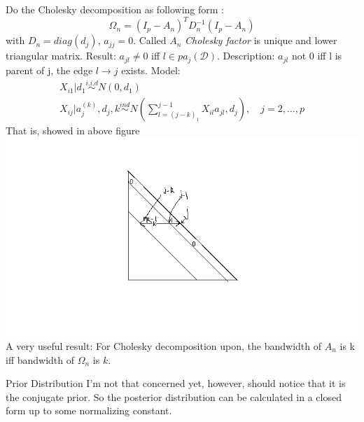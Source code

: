 \documentclass[]{article}
\begin{document}
Do the Cholesky decomposition as following form : \[
\Omega _ { n } = \left( I _ { p } - A _ { n } \right) ^ { T } D _ { n } ^ { - 1 } \left( I _ { p } - A _ { n } \right)
\] with \(D_n=diag(d_j)\), \(a_{jj}=0\). Called \(A_n\) \emph{Cholesky
factor} is unique and lower triangular matrix. Result: \(a_{jl}\neq0\)
iff \(l\in pa_j(\mathcal D)\). Description: \(a_{jl}\) not 0 iff l is
parent of j, the edge \(l\rightarrow j\) exists. Model: \[
\begin{array}
{ c } { X _ { i 1 } | d _ { 1 } \overset { i . i . d } { \sim } N \left( 0 , d _ { 1 } \right) } \\ 
{ X _ { i j } | a _ { j } ^ { ( k ) } , d _ { j } , k \overset { i n d } { \sim } N \left( \sum _ { l = ( j - k ) _ { 1 } } ^ { j - 1 } X _ { i l } a _ { j l } , d _ { j } \right) , \quad j = 2 , \ldots , p} 
\end{array}
\] That is, showed in above figure \includegraphics{bandedMatrix.png} A
very useful result: For Cholesky decomposition upon, the bandwidth of
\(A_n\) is k iff bandwidth of \(\Omega_n\) is \(k\).




Prior Distribution I'm not that concerned yet, however, should notice
that it is the conjugate prior. So the posterior distribution can be calculated in a closed form up to some normalizing constant.
\end{document}
